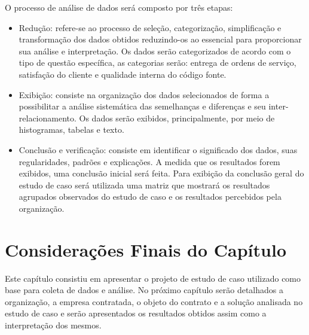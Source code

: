 O processo de análise de dados será composto por três etapas:
\begin{itemize}
\item Redução: refere-se ao processo de seleção, categorização, simplificação e transformação dos dados obtidos reduzindo-os ao essencial para proporcionar sua análise e interpretação. Os dados serão categorizados de acordo com o tipo de questão específica, as categorias serão: entrega de ordens de serviço, satisfação do cliente e qualidade interna do código fonte.
\item Exibição: consiste na organização dos dados selecionados de forma a possibilitar a análise sistemática das semelhanças e diferenças e seu inter-relacionamento. Os dados serão exibidos, principalmente, por meio de histogramas, tabelas e texto.
\item Conclusão e verificação: consiste em identificar o significado dos dados, suas regularidades, padrões e explicações. A medida que os resultados forem exibidos, uma conclusão inicial será feita. Para exibição da conclusão geral do estudo de caso será utilizada uma matriz que mostrará os resultados agrupados observados do estudo de caso e os resultados percebidos pela organização. 
\end{itemize}


\section[Considerações Finais do Capítulo]{Considerações Finais do Capítulo}

Este capítulo consistiu em apresentar o projeto de estudo de caso utilizado como base para coleta de dados e análise. No próximo capítulo serão detalhados a organização, a empresa contratada, o objeto do contrato e a solução analisada no estudo de caso e serão apresentados os resultados obtidos assim como a interpretação dos mesmos.